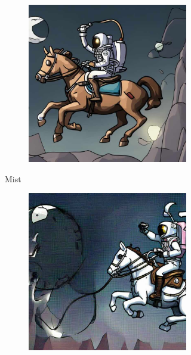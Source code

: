 \documentclass{article}
\begin{document}
\begin{figure}[h]
\begin{subfigure}[t]{\textwidth}
\begin{subfigure}[b]{0.19\textwidth}
         \includegraphics[width=\textwidth]{plots/process/generations/mist/upscale.jpeg}
     \end{subfigure}
    \caption{Mist}
    \vspace{0.5em}
    \end{subfigure}
    \begin{subfigure}[t]{\textwidth}
        \begin{subfigure}[b]{0.19\textwidth}
         \centering

         \includegraphics[width=\textwidth]{plots/process/generations/antidb/none.jpeg}
     \end{subfigure}
     \hfill
     \begin{subfigure}[b]{0.19\textwidth}
         \centering


\end{subfigure}
\end{subfigure}
\end{figure}
\end{document}
